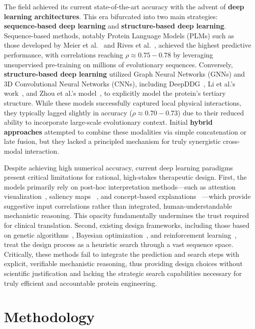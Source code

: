 \documentclass[11pt]{article}
\begin{document}
The field achieved its current state-of-the-art accuracy with the advent of
\textbf{deep learning architectures}. This era bifurcated into two main
strategies: \textbf{sequence-based deep learning} and \textbf{structure-based
deep learning}. Sequence-based methods, notably Protein Language Models (PLMs)
such as those developed by Meier et al.~\cite{meier2021language} and Rives et
al.~\cite{rives2021biological}, achieved the highest predictive performance,
with correlations reaching $\rho \approx 0.75-0.78$ by leveraging unsupervised
pre-training on millions of evolutionary sequences. Conversely,
\textbf{structure-based deep learning} utilized Graph Neural Networks (GNNs)
and 3D Convolutional Neural Networks (CNNs), including 
DeepDDG~\cite{cao2019deepddg}, Li et al.'s work~\cite{li2020predicting}, and Zhou et
al.'s model~\cite{zhou2020mutation}, to explicitly model the protein's
tertiary structure. While these models successfully captured local physical
interactions, they typically lagged slightly in accuracy ($\rho \approx
0.70-0.73$) due to their reduced ability to incorporate large-scale
evolutionary context. Initial \textbf{hybrid approaches} attempted to combine
these modalities via simple concatenation or late fusion, but they lacked a
principled mechanism for truly synergistic cross-modal interaction.

Despite achieving high numerical accuracy, current deep learning paradigms
present critical limitations for rational, high-stakes therapeutic design.
First, the models primarily rely on post-hoc interpretation methods—such as
attention visualization~\cite{vig2021bertology}, saliency maps
~\cite{sundararajan2017axiomatic}, and concept-based explanations
~\cite{kim2018interpretability}—which provide suggestive input correlations
rather than integrated, human-understandable mechanistic reasoning. This
opacity fundamentally undermines the trust required for clinical translation.
Second, existing design frameworks, including those based on genetic 
algorithms~\cite{romero2009exploring}, Bayesian optimization~\cite{laine2021protein},
and reinforcement learning~\cite{angermueller2019model}, treat the design
process as a heuristic search through a vast sequence space. Critically, these
methods fail to integrate the prediction and search steps with explicit,
verifiable mechanistic reasoning, thus providing design choices without
scientific justification and lacking the strategic search capabilities
necessary for truly efficient and accountable protein engineering.


\section{Methodology}
\end{document}
